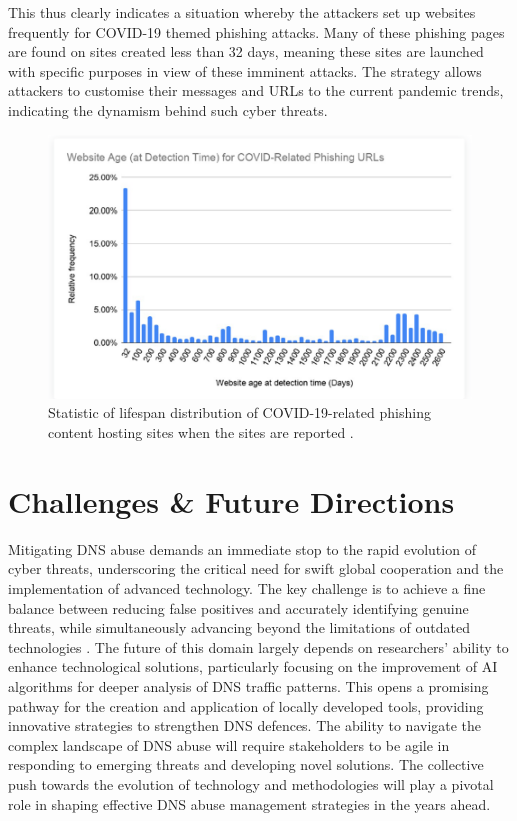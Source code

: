 This thus clearly indicates a situation whereby the attackers set up websites frequently for COVID-19 themed phishing attacks. Many of these phishing pages are found on sites created less than 32 days, meaning these sites are launched with specific purposes in view of these imminent attacks. The strategy allows attackers to customise their messages and URLs to the current pandemic trends, indicating the dynamism behind such cyber threats.

\captionsetup{font= footnotesize}
\begin{figure}[H]
    \centering
    \includegraphics[width=0.8\linewidth]{background/AgeCovid.png}
    \caption{Statistic of lifespan distribution of COVID-19-related phishing content hosting sites when the sites are reported .}
    \label{fig:figSixteen}
\end{figure}


\section{Challenges \& Future Directions}

Mitigating DNS abuse demands an immediate stop to the rapid evolution of cyber threats, underscoring the critical need for swift global cooperation and the implementation of advanced technology. The key challenge is to achieve a fine balance between reducing false positives and accurately identifying genuine threats, while simultaneously advancing beyond the limitations of outdated technologies \cite{pour2023comprehensive}. The future of this domain largely depends on researchers' ability to enhance technological solutions, particularly focusing on the improvement of AI algorithms for deeper analysis of DNS traffic patterns. This opens a promising pathway for the creation and application of locally developed tools, providing innovative strategies to strengthen DNS defences. The ability to navigate the complex landscape of DNS abuse will require stakeholders to be agile in responding to emerging threats and developing novel solutions. The collective push towards the evolution of technology and methodologies will play a pivotal role in shaping effective DNS abuse management strategies in the years ahead.


